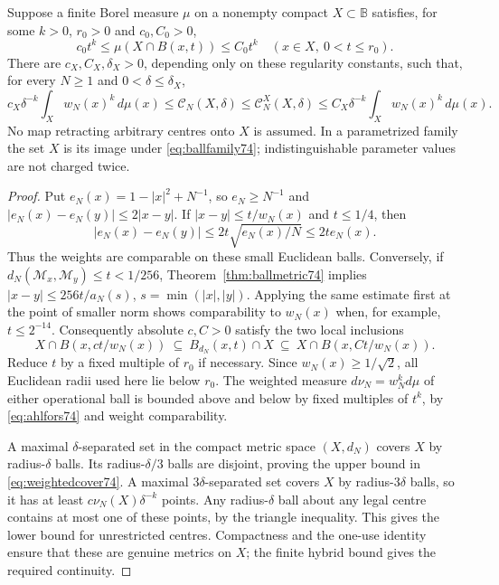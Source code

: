 \begin{theorem}\label{thm:weightedcover74}
Suppose a finite Borel measure $\mu$ on a nonempty compact
$X\subset\mathbb B$ satisfies, for some $k>0$, $r_0>0$ and $c_0,C_0>0$,
\begin{equation}\label{eq:ahlfors74}
 c_0 t^k\le\mu(X\cap B(x,t))\le C_0t^k
           \quad(x\in X,\ 0<t\le r_0).
\end{equation}
There are $c_X,C_X,\delta_X>0$, depending only on these regularity
constants, such that, for every $N\ge1$ and $0<\delta\le\delta_X$,
\begin{equation}\label{eq:weightedcover74}
 c_X\delta^{-k}\int_X w_N(x)^k\,d\mu(x)
 \le\mathcal C_N(X,\delta)
 \le\mathcal C_N^X(X,\delta)
 \le C_X\delta^{-k}\int_X w_N(x)^k\,d\mu(x).
\end{equation}
No map retracting arbitrary centres onto $X$ is assumed. In a
parametrized family the set $X$ is its image under \eqref{eq:ballfamily74};
indistinguishable parameter values are not charged twice.
\end{theorem}
\begin{proof}
Put $e_N(x)=1-|x|^2+N^{-1}$, so $e_N\ge N^{-1}$ and
$|e_N(x)-e_N(y)|\le2|x-y|$. If
$|x-y|\le t/w_N(x)$ and $t\le1/4$, then
\[
 |e_N(x)-e_N(y)|\le2t\sqrt{e_N(x)/N}\le2t e_N(x).
\]
Thus the weights are comparable on these small Euclidean balls.
Conversely, if $d_N(\mathcal M_x,\mathcal M_y)\le t<1/256$,
Theorem~\ref{thm:ballmetric74} implies
$|x-y|\le256t/a_N(s)$, $s=\min(|x|,|y|)$. Applying the same estimate
first at the point of smaller norm shows comparability to $w_N(x)$
when, for example, $t\le2^{-14}$. Consequently absolute $c,C>0$
satisfy the two local inclusions
\[
 X\cap B(x,ct/w_N(x))\ \subseteq\ B_{d_N}(x,t)\cap X
 \ \subseteq\ X\cap B(x,Ct/w_N(x)).
\]
Reduce $t$ by a fixed multiple of $r_0$ if necessary. Since
$w_N(x)\ge1/\sqrt2$, all Euclidean radii used here lie below $r_0$.
The weighted measure $d\nu_N=w_N^k d\mu$ of either operational ball
is bounded above and below by fixed multiples of $t^k$, by
\eqref{eq:ahlfors74} and weight comparability.

A maximal $\delta$-separated set in the compact metric space
$(X,d_N)$ covers $X$ by radius-$\delta$ balls. Its radius-$\delta/3$
balls are disjoint, proving the upper bound in
\eqref{eq:weightedcover74}. A maximal $3\delta$-separated set covers
$X$ by radius-$3\delta$ balls, so it has at least
$c\nu_N(X)\delta^{-k}$ points. Any radius-$\delta$ ball about any
legal centre contains at most one of these points, by the triangle
inequality. This gives the lower bound for unrestricted centres.
Compactness and the one-use identity ensure that these are genuine
metrics on $X$; the finite hybrid bound gives the required continuity.
\end{proof}

